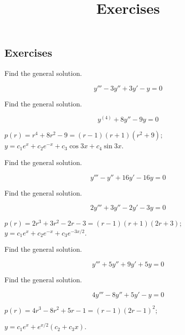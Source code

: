 \documentclass{ximera}
\title{Exercises} \license{CC BY-NC-SA 4.0}
\begin{document}
\begin{abstract}
\end{abstract}
\maketitle

\begin{onlineOnly}
\section*{Exercises}
\end{onlineOnly}


\begin{problem}\label{exer:9.2.1}  Find the general solution.

$$y'''-3y''+3y'-y=0$$
\end{problem}

\begin{problem}\label{exer:9.2.2} Find the general solution.

$$y^{(4)}+8y''-9y=0$$

\begin{solution}
$p(r)=r^4+8r^2-9=(r-1)(r+1)(r^2+9)$;
 $y=c_1e^x+c_2e^{-x}+c_3\cos3x+c_4\sin3x$.
\end{solution}

\end{problem}

\begin{problem}\label{exer:9.2.3} Find the general solution.

$$y'''-y''+16y'-16y=0$$

\end{problem}


\begin{problem}\label{exer:9.2.4} Find the general solution.

$$2y'''+3y''-2y'-3y=0$$

\begin{solution}
$p(r)=2r^3+3r^2-2r-3=(r-1)(r+1)(2r+3)$;
$y=c_1e^x+c_2e^{-x}+c_3e^{-3x/2}$.
\end{solution}
\end{problem}

\begin{problem}\label{exer:9.2.5} Find the general solution.

$$y'''+5y''+9y'+5y=0$$

\end{problem}


\begin{problem}\label{exer:9.2.6}  Find the general solution.

$$4y'''-8y''+5y'-y=0$$

\begin{solution}
$p(r)=4r^3-8r^2+5r-1=(r-1)(2r-1)^2$;

$y=c_1e^x+e^{x/2}(c_2+c_3x)$.
\end{solution}

\end{problem}
\end{document}

